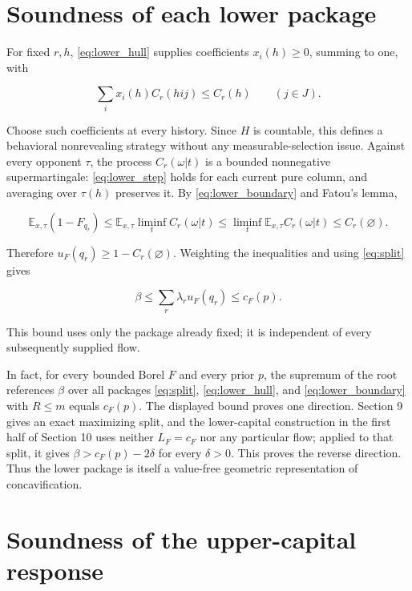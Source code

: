 \documentclass[11pt,a4paper]{article}
\begin{document}
\section{Soundness of each lower package}

For fixed \(r,h\), \eqref{eq:lower_hull} supplies coefficients \(x_i(h)\ge0\), summing to one, with

\begin{equation}
\sum_i x_i(h)C_r(hij)\le C_r(h)\qquad(j\in J). \label{eq:lower_step}
\end{equation}

Choose such coefficients at every history. Since \(H\) is countable, this defines a behavioral nonrevealing strategy without any measurable-selection issue. Against every opponent \(\tau\), the process \(C_r(\omega|t)\) is a bounded nonnegative supermartingale: \eqref{eq:lower_step} holds for each current pure column, and averaging over \(\tau(h)\) preserves it. By \eqref{eq:lower_boundary} and Fatou's lemma,

\[
\mathbb E_{x,\tau}(1-F_{q_r})
\le\mathbb E_{x,\tau}\liminf_t C_r(\omega|t)
\le\liminf_t\mathbb E_{x,\tau}C_r(\omega|t)
\le C_r(\varnothing).
\]

Therefore \(u_F(q_r)\ge1-C_r(\varnothing)\). Weighting the inequalities and using \eqref{eq:split} gives

\begin{equation}
\beta\le\sum_r\lambda_r u_F(q_r)\le c_F(p). \label{eq:reference_bound}
\end{equation}

This bound uses only the package already fixed; it is independent of every subsequently supplied flow.

In fact, for every bounded Borel \(F\) and every prior \(p\), the supremum of the root references \(\beta\) over all packages \eqref{eq:split}, \eqref{eq:lower_hull}, and \eqref{eq:lower_boundary} with \(R\le m\) equals \(c_F(p)\). The displayed bound proves one direction. Section 9 gives an exact maximizing split, and the lower-capital construction in the first half of Section 10 uses neither \(L_F=c_F\) nor any particular flow; applied to that split, it gives \(\beta>c_F(p)-2\delta\) for every \(\delta>0\). This proves the reverse direction. Thus the lower package is itself a value-free geometric representation of concavification.

\section{Soundness of the upper-capital response}
\end{document}
